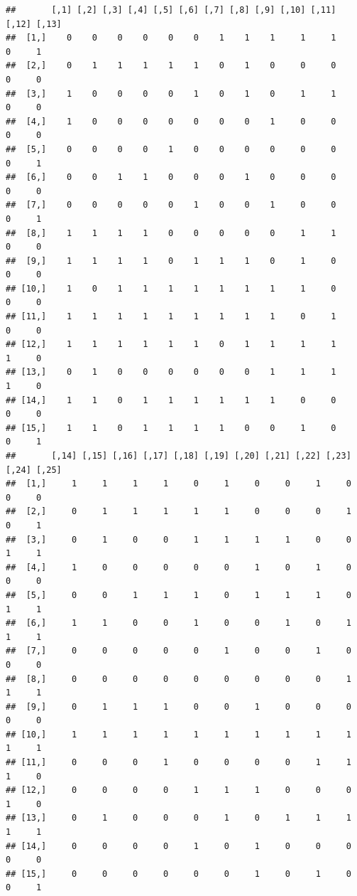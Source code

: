 \documentclass[
]{book}
\begin{document}
\begin{verbatim}
##       [,1] [,2] [,3] [,4] [,5] [,6] [,7] [,8] [,9] [,10] [,11] [,12] [,13]
##  [1,]    0    0    0    0    0    0    1    1    1     1     1     0     1
##  [2,]    0    1    1    1    1    1    0    1    0     0     0     0     0
##  [3,]    1    0    0    0    0    1    0    1    0     1     1     0     0
##  [4,]    1    0    0    0    0    0    0    0    1     0     0     0     0
##  [5,]    0    0    0    0    1    0    0    0    0     0     0     0     1
##  [6,]    0    0    1    1    0    0    0    1    0     0     0     0     0
##  [7,]    0    0    0    0    0    1    0    0    1     0     0     0     1
##  [8,]    1    1    1    1    0    0    0    0    0     1     1     0     0
##  [9,]    1    1    1    1    0    1    1    1    0     1     0     0     0
## [10,]    1    0    1    1    1    1    1    1    1     1     0     0     0
## [11,]    1    1    1    1    1    1    1    1    1     0     1     0     0
## [12,]    1    1    1    1    1    1    0    1    1     1     1     1     0
## [13,]    0    1    0    0    0    0    0    0    1     1     1     1     0
## [14,]    1    1    0    1    1    1    1    1    1     0     0     0     0
## [15,]    1    1    0    1    1    1    1    0    0     1     0     0     1
##       [,14] [,15] [,16] [,17] [,18] [,19] [,20] [,21] [,22] [,23] [,24] [,25]
##  [1,]     1     1     1     1     0     1     0     0     1     0     0     0
##  [2,]     0     1     1     1     1     1     0     0     0     1     0     1
##  [3,]     0     1     0     0     1     1     1     1     0     0     1     1
##  [4,]     1     0     0     0     0     0     1     0     1     0     0     0
##  [5,]     0     0     1     1     1     0     1     1     1     0     1     1
##  [6,]     1     1     0     0     1     0     0     1     0     1     1     1
##  [7,]     0     0     0     0     0     1     0     0     1     0     0     0
##  [8,]     0     0     0     0     0     0     0     0     0     1     1     1
##  [9,]     0     1     1     1     0     0     1     0     0     0     0     0
## [10,]     1     1     1     1     1     1     1     1     1     1     1     1
## [11,]     0     0     0     1     0     0     0     0     1     1     1     0
## [12,]     0     0     0     0     1     1     1     0     0     0     1     0
## [13,]     0     1     0     0     0     1     0     1     1     1     1     1
## [14,]     0     0     0     0     1     0     1     0     0     0     0     0
## [15,]     0     0     0     0     0     0     1     0     1     0     0     1
\end{verbatim}
\end{document}
